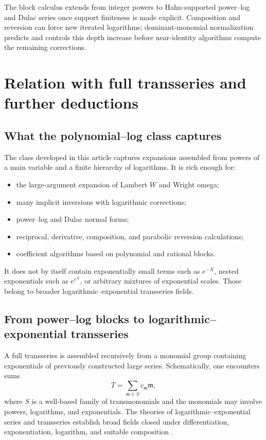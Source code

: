 \documentclass[11pt,openany]{book}
\theoremstyle{definition}
\theoremstyle{plain}
\theoremstyle{remark}
\newcommand{\m}{\mathfrak{m}}
\begin{document}
\begin{summarybox}
The block calculus extends from integer powers to Hahn-supported power--log and Dulac series once support finiteness is made explicit. Composition and reversion can force new iterated logarithms; dominant-monomial normalization predicts and controls this depth increase before near-identity algorithms compute the remaining corrections.
\end{summarybox}

\chapter{Relation with full transseries and further deductions}\label{ch:full-transseries}

\section{What the polynomial--log class captures}
The class developed in this article captures expansions assembled from powers of a main variable and a finite hierarchy of logarithms. It is rich enough for:
\begin{itemize}
\item the large-argument expansion of Lambert \(W\) and Wright omega;
\item many implicit inversions with logarithmic corrections;
\item power--log and Dulac normal forms;
\item reciprocal, derivative, composition, and parabolic reversion calculations;
\item coefficient algorithms based on polynomial and rational blocks.
\end{itemize}
It does not by itself contain exponentially small terms such as \(e^{-X}\), nested exponentials such as \(e^{e^X}\), or arbitrary mixtures of exponential scales. Those belong to broader logarithmic--exponential transseries fields.

\section{From power--log blocks to logarithmic--exponential transseries}
A full transseries is assembled recursively from a monomial group containing exponentials of previously constructed large series. Schematically, one encounters sums
\[
 T=\sum_{\m\in S}c_\m\m,
\]
where \(S\) is a well-based family of transmonomials and the monomials may involve powers, logarithms, and exponentials. The theories of logarithmic--exponential series and transseries establish broad fields closed under differentiation, exponentiation, logarithm, and suitable composition \cite{vdDMM-1997,vdDMM-2001,vdhoeven-book,adh-book}.
\end{document}
